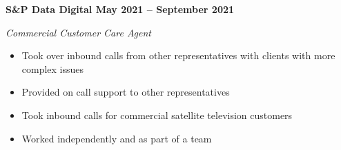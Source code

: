 \vspace{0.1cm}
\textbf{S\&P Data Digital \hfill May 2021 -- September 2021} \par
\textit{Commercial Customer Care Agent} \par
\begin{itemize}
	\item Took over inbound calls from other representatives with clients with more complex issues
    \item Provided on call support to other representatives
    \item Took inbound calls for commercial satellite television customers
    \item Worked independently and as part of a team
\end{itemize} \par